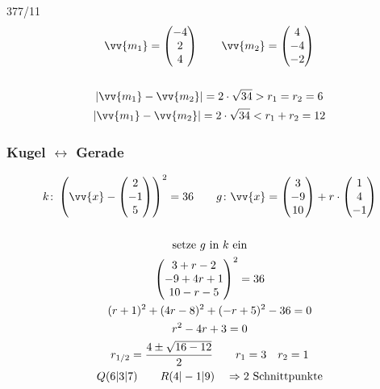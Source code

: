 \begin{exercise}{377/11}
\begin{gather*}
    \vv{m_1} = \begin{pmatrix}-4 \\ 2 \\ 4\end{pmatrix} \qquad \vv{m_2} = \begin{pmatrix}4 \\ -4 \\ -2\end{pmatrix} \\\\
    |\vv{m_1} - \vv{m_2}| = 2 \cdot \sqrt{34} > r_1 = r_2 = 6 \\
    |\vv{m_1} - \vv{m_2}| = 2 \cdot \sqrt{34} < r_1 + r_2 = 12
  \end{gather*}
\end{exercise}
\subsubsection{Kugel $\leftrightarrow$ Gerade}
\begin{gather*}
  k \colon \left(\vv{x} - \begin{pmatrix}2 \\ -1 \\ 5\end{pmatrix}\right)^2 = 36 \qquad g \colon \vv{x} = \begin{pmatrix}3 \\ -9 \\ 10\end{pmatrix} + r \cdot \begin{pmatrix}1 \\ 4 \\ -1\end{pmatrix} \\\\
  \text{setze $g$ in $k$ ein} \\
  \begin{pmatrix}3 + r - 2 \\ -9 + 4r + 1 \\ 10 - r - 5\end{pmatrix}^2 = 36 \\
  (r + 1)^2 + (4r - 8)^2 + (-r + 5)^2 - 36 = 0 \\
  r^2 - 4r + 3 = 0 \\
  r_{1/2} = \frac{4 \pm \sqrt{16 - 12}}{2} \qquad r_1 = 3 \quad r_2 = 1 \\
  Q(6|3|7) \qquad R(4|-1|9) \quad\Rightarrow\text{2 Schnittpunkte}
\end{gather*}
